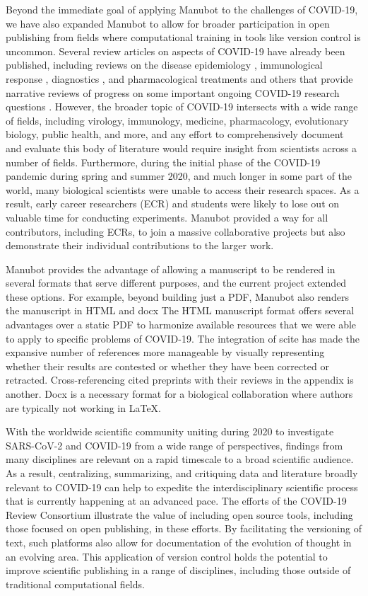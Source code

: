 \documentclass[sigconf]{acmart}
\begin{document}
Beyond the immediate goal of applying Manubot to the challenges of COVID-19, we have also expanded Manubot to allow for broader participation in open publishing from fields where computational training in tools like version control is uncommon.
Several review articles on aspects of COVID-19 have already been published, including reviews on the disease epidemiology \citep{I2EsJmfs}, immunological response \citep{5x25saIz}, diagnostics \citep{evtsR3C5}, and pharmacological treatments \citep{5x25saIz, 18eCxyLhx} and others that provide narrative reviews of progress on some important ongoing COVID-19 research questions \citep{SAE5ME3N, xOs5ctsW}.
However, the broader topic of COVID-19 intersects with a wide range of fields, including virology, immunology, medicine, pharmacology, evolutionary biology, public health, and more, and any effort to comprehensively document and evaluate this body of literature would require insight from scientists across a number of fields.
Furthermore, during the initial phase of the COVID-19 pandemic during spring and summer 2020, and much longer in some part of the world, many biological scientists were unable to access their research spaces.
As a result, early career researchers (ECR) and students were likely to lose out on valuable time for conducting experiments.
Manubot provided a way for all contributors, including ECRs, to join a massive collaborative projects but also demonstrate their individual contributions to the larger work.

Manubot provides the advantage of allowing a manuscript to be rendered in several formats that serve different purposes, and the current project extended these options.
For example, beyond building just a PDF, Manubot also renders the manuscript in HTML and docx
The HTML manuscript format offers several advantages over a static PDF to harmonize available resources that we were able to apply to specific problems of COVID-19.
The integration of scite has made the expansive number of references more manageable by visually representing whether their results are contested or whether they have been corrected or retracted.
Cross-referencing cited preprints with their reviews in the appendix is another.
Docx is a necessary format for a biological collaboration where authors are typically not working in LaTeX.

With the worldwide scientific community uniting during 2020 to investigate SARS-CoV-2 and COVID-19 from a wide range of perspectives, findings from many disciplines are relevant on a rapid timescale to a broad scientific audience.
As a result, centralizing, summarizing, and critiquing data and literature broadly relevant to COVID-19 can help to expedite the interdisciplinary scientific process that is currently happening at an advanced pace.
The efforts of the COVID-19 Review Consortium illustrate the value of including open source tools, including those focused on open publishing, in these efforts.
By facilitating the versioning of text, such platforms also allow for documentation of the evolution of thought in an evolving area.
This application of version control holds the potential to improve scientific publishing in a range of disciplines, including those outside of traditional computational fields.
\end{document}
